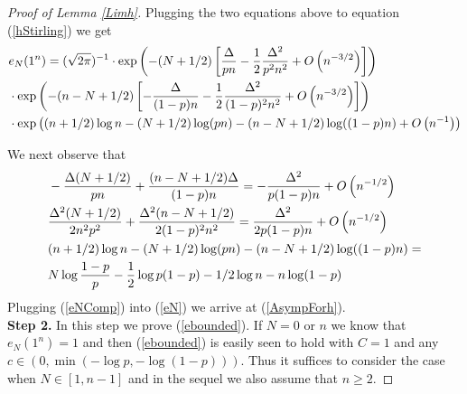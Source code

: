 \begin{proof}[Proof of Lemma \ref{Limh}]
Plugging the two equations above to equation (\ref{hStirling}) we get
\begin{equation}{\label{eN}}
\begin{split}
	& e_{N}(1^n)= (\sqrt{2\pi})^{-1}\cdot \exp\left(-(N+1/2)\left[\frac{\Delta}{pn}-\frac{1}{2}\frac{\Delta^2}{p^2 n^2}+O\left(n^{-3/2}\right)\right]\right)\\
	& \cdot \exp\left(-(n-N+1/2)\left[-\frac{\Delta}{(1-p)n}-\frac{1}{2}\frac{\Delta^2}{(1-p)^2 n^2}+O\left(n^{-3/2}\right)\right]\right)\\
	& \cdot \exp\left((n+1/2)\log n-(N+1/2)\log (pn)-(n-N+1/2)\log((1-p)n)+O\left(n^{-1}\right)\right)
\end{split}
\end{equation}

We next observe that 
\begin{equation}{\label{eNComp}}
	\begin{split}
		&-\frac{\Delta(N+1/2)}{pn}+\frac{(n-N+1/2)\Delta}{(1-p)n}=-\frac{\Delta^{2}}{p(1-p)n}+O\left(n^{-1/2}\right)\\
		 &\frac{\Delta^2(N+1/2)}{2n^2 p^2}+\frac{\Delta^2 (n-N+1/2)}{2(1-p)^2 n^2}=\frac{\Delta^2}{2p(1-p)n}+O\left(n^{-1/2}\right)\\
		&(n+1/2)\log n-(N+1/2)\log (pn)-(n-N+1/2)\log((1-p)n)=\\
		&N\log \frac{1-p}{p}-\frac{1}{2}\log p(1-p)-1/2\log n-n\log(1-p) 
	\end{split}
\end{equation}
Plugging (\ref{eNComp}) into (\ref{eN}) we arrive at (\ref{AsympForh}).\\
\textbf{Step 2.} In this step we prove (\ref{ebounded}). If $N=0$ or $n$ we know that $e_{N}(1^n)=1$ and then (\ref{ebounded}) is easily seen to hold with $C=1$ and any $c\in\left(0,\min(-\log p, -\log(1-p))\right)$. Thus it suffices to consider the case when $N\in[1,n-1]$ and in the sequel we also assume that $n\geq 2$.


\end{proof}
